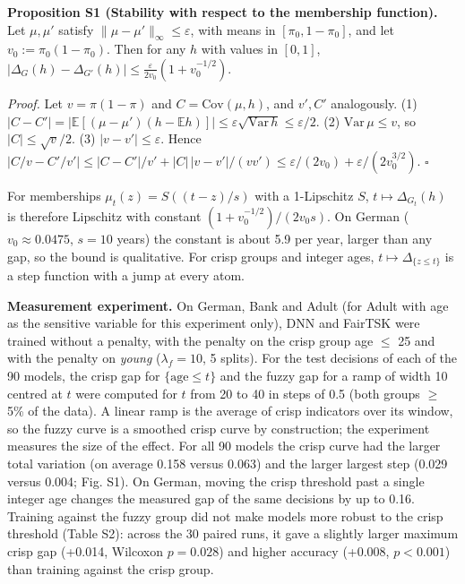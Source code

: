 \documentclass[pdflatex,sn-basic,Numbered]{sn-jnl}
\begin{document}
\textbf{Proposition S1 (Stability with respect to the membership function).} Let \(\mu,\mu'\) satisfy \(\|\mu - \mu'\|_{\infty} \leq \varepsilon\), with means in \([\pi_{0},1 - \pi_{0}]\), and let \(v_{0} := \pi_{0}(1 - \pi_{0})\). Then for any \(h\) with values in \([0,1]\), \(|\Delta_{G}(h) - \Delta_{G'}(h)| \leq \frac{\varepsilon}{2v_{0}}(1 + v_{0}^{-1/2})\).

\emph{Proof.} Let \(v = \pi(1 - \pi)\) and \(C = \mathrm{Cov}(\mu,h)\), and \(v',C'\) analogously. (1) \(|C - C'| = |\mathbb{E}[(\mu - \mu')(h - \mathbb{E}h)]| \leq \varepsilon\sqrt{\mathrm{Var}\,h} \leq \varepsilon/2\). (2) \(\mathrm{Var}\,\mu \leq v\), so \(|C| \leq \sqrt{v}/2\). (3) \(|v - v'| \leq \varepsilon\). Hence \(|C/v - C'/v'| \leq |C - C'|/v' + |C|\,|v - v'|/(v v') \leq \varepsilon/(2v_0) + \varepsilon/(2v_0^{3/2})\). \(\square\)

For memberships \(\mu_t(z) = S((t - z)/s)\) with a 1-Lipschitz \(S\), \(t \mapsto \Delta_{G_t}(h)\) is therefore Lipschitz with constant \((1 + v_{0}^{-1/2})/(2v_{0}s)\). On German (\(v_0 \approx 0.0475\), \(s = 10\) years) the constant is about 5.9 per year, larger than any gap, so the bound is qualitative. For crisp groups and integer ages, \(t \mapsto \Delta_{\{z \leq t\}}\) is a step function with a jump at every atom.

\textbf{Measurement experiment.} On German, Bank and Adult (for Adult with age as the sensitive variable for this experiment only), DNN and FairTSK were trained without a penalty, with the penalty on the crisp group age \ensuremath{\le} 25 and with the penalty on \emph{young} (\(\lambda_f = 10\), 5 splits). For the test decisions of each of the 90 models, the crisp gap for \(\{\text{age} \leq t\}\) and the fuzzy gap for a ramp of width 10 centred at \(t\) were computed for \(t\) from 20 to 40 in steps of 0.5 (both groups \ensuremath{\ge} 5\% of the data). A linear ramp is the average of crisp indicators over its window, so the fuzzy curve is a smoothed crisp curve by construction; the experiment measures the size of the effect. For all 90 models the crisp curve had the larger total variation (on average 0.158 versus 0.063) and the larger largest step (0.029 versus 0.004; Fig. S1). On German, moving the crisp threshold past a single integer age changes the measured gap of the same decisions by up to 0.16. Training against the fuzzy group did not make models more robust to the crisp threshold (Table S2): across the 30 paired runs, it gave a slightly larger maximum crisp gap (+0.014, Wilcoxon \(p = 0.028\)) and higher accuracy (+0.008, \(p < 0.001\)) than training against the crisp group.
\end{document}
